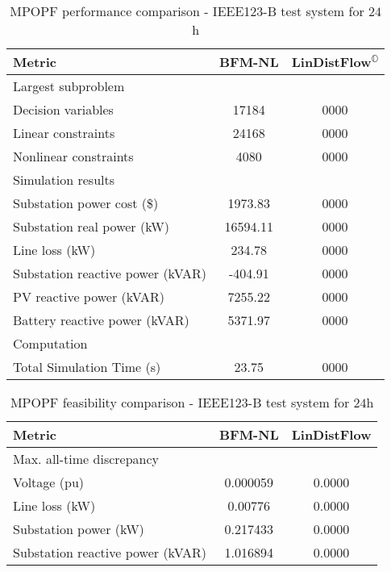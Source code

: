\documentclass[../../outputs/main.tex]{subfiles}
\begin{document}
\begin{table}[t] %
    \centering
    \caption{MPOPF performance comparison - IEEE123-B test system for $24$h}
    \begin{tabular}{|l|c|c|}
    \hline
    \textbf{Metric} & \textbf{BFM-NL} & \textbf{LinDistFlow\textsuperscript{\(\mathbb{O}\)}} \\ \hline
    Largest subproblem & \multicolumn{2}{c|}{} \\ \hline
    \quad Decision variables & {17184} & {0000} \\ \hline
    \quad Linear constraints & {24168} & {0000} \\ \hline
    \quad Nonlinear constraints & {4080} & {0000} \\ \hline
    Simulation results  & \multicolumn{2}{c|}{} \\ \hline
    \quad Substation power cost (\$) & 1973.83 & 0000 \\ \hline
    \quad Substation real power (kW) & 16594.11 & 0000 \\ \hline
    \quad Line loss (kW) & 234.78 & 0000 \\ \hline
    \quad Substation reactive power (kVAR) & -404.91 & 0000 \\ \hline
    \quad PV reactive power (kVAR) & 7255.22 & 0000 \\ \hline
    \quad Battery reactive power (kVAR) & 5371.97 & 0000 \\ \hline
    Computation  & \multicolumn{2}{c|}{} \\ \hline
    \quad Total Simulation Time (s) & 23.75 & 0000 \\ \hline
    \end{tabular}
    \label{table:opt-ieee123B-24h}
    \vspace{-3mm}
\end{table}

\begin{table}[t]
    \centering
    \caption{MPOPF feasibility comparison - IEEE123-B test system for $24$h}
    \begin{tabular}{|l|c|c|}
    \hline
    \textbf{Metric} & \textbf{BFM-NL} & \textbf{LinDistFlow} \\ \hline
    Max. all-time discrepancy & \multicolumn{2}{c|}{} \\ \hline
    \quad Voltage (pu) & 0.000059 & 0.0000 \\ \hline
    \quad Line loss (kW) & 0.00776 & 0.0000 \\ \hline
    \quad Substation power (kW) & 0.217433 & 0.0000 \\ \hline
    \quad Substation reactive power (kVAR) & 1.016894 & 0.0000 \\ \hline
    \end{tabular}
    \label{table:feas-ieee123B-24h}
    \vspace{-3mm}
\end{table}
\end{document}
